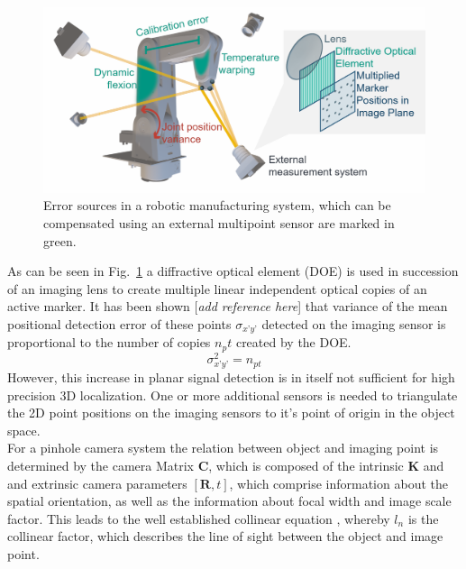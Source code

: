 \documentclass[5p,times,procedia]{elsarticle}
\begin{document}
\begin{figure}[h]
	\centering
	\includegraphics[width=\columnwidth]{graphics/error_sources.png}
	\caption{Error sources in a robotic manufacturing system, which can be compensated using an external multipoint  sensor are marked in green.}
	\label{fig:error_sources}
\end{figure}

As can be seen in Fig.~\ref{fig:error_sources} a diffractive optical element (DOE) is used in succession of an imaging lens to create multiple linear independent optical copies of an active marker.
It has been shown [\textit{add reference here}] that variance of the mean positional detection error of these points $\sigma_{x’y’}$ detected on the imaging sensor is proportional to the number of copies $n_pt$ created by the DOE.
\begin{equation}
	\sigma_{x’y’}^2 = n_{pt}^{}
\end{equation}
However, this increase in planar signal detection is in itself not sufficient for high precision 3D localization. One or more additional sensors is needed to triangulate the 2D point positions on the imaging sensors to it’s point of origin in the object space. \\
For a pinhole camera system the relation between object and imaging point is determined by the camera Matrix $\mathbf{C}$, which is composed of the intrinsic $\mathbf{K}$ and  and extrinsic camera parameters $[\mathbf{R}, t]$, which comprise information about the spatial orientation, as well as the information about focal width and
image scale factor. This leads to the well established collinear equation \cite{Luhmann2003}, whereby $l_n$ is the collinear factor, which describes the line of sight between the object and image point.
\end{document}

